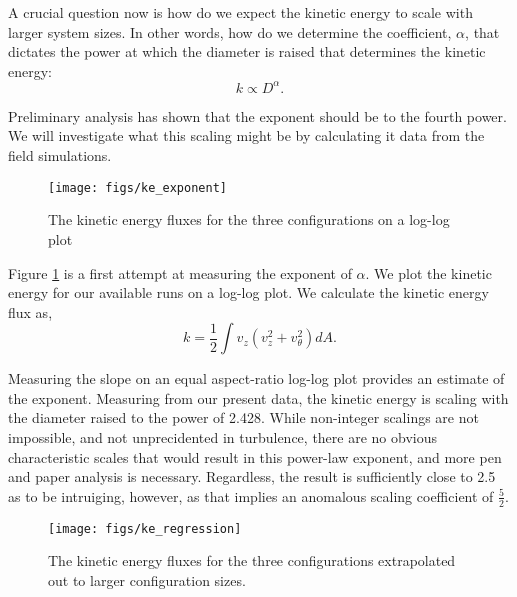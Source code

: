 \documentclass[english]{article}
\begin{document}
A crucial question now is how do we expect the kinetic energy to scale with larger system sizes. In other words, 
how do we determine the coefficient, $\alpha$, that dictates the power
at which the diameter is raised that determines the kinetic energy: 
\begin{equation}
k \propto D^\alpha. 
\end{equation}

Preliminary analysis has shown that the exponent should be to the fourth
power. We will investigate what this scaling might be by calculating it
data from the field simulations.  

\begin{figure}[!htb]
  \begin{center}
    \texttt{[image: figs/ke\_exponent]}
    \caption{The kinetic energy fluxes for the three configurations on a
   log-log plot}
    \label{fig:ke_exponent}
  \end{center}
\end{figure}

Figure \ref{fig:ke_exponent} is a first attempt at measuring the
exponent of $\alpha$. We plot the kinetic energy for our available
runs on a log-log plot. We calculate the kinetic energy flux as, 
\begin{equation}
k = \frac{1}{2} \int v_z (v_z^2 + v_{\theta}^2) dA. 
\label{ke_flux}
\end{equation}

Measuring the slope on an equal aspect-ratio log-log plot provides an estimate of the exponent. 
Measuring from our present data, the kinetic energy is scaling with the diameter raised to the power of 2.428. 
While non-integer scalings are not impossible, and not unprecidented in
turbulence, there are no obvious characteristic scales that would result
in this power-law exponent, and more pen and paper analysis is
necessary. Regardless, the result is sufficiently close to 2.5 as to be
intruiging, however, as that implies an anomalous scaling coefficient of
$\frac{5}{2}$.  


\begin{figure}[!htb]
  \begin{center}
    \texttt{[image: figs/ke\_regression]}
    \caption{The kinetic energy fluxes for the three configurations extrapolated out to larger configuration sizes.}
    \label{fig:ke_regression}
  \end{center}
\end{figure}
\end{document}
